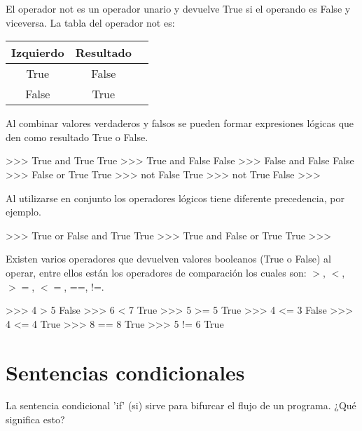 El operador not es un operador unario y devuelve True si el operando es False y viceversa. La tabla del operador not es:\\

\begin{table}[h]
\centering
\begin{tabular}{|c|c|c|} \hline
Izquierdo    & Resultado      \\ \hline
True         & False        \\ \hline
False        & True        \\ \hline
\end{tabular}
\end{table}

Al combinar valores verdaderos y falsos se pueden formar expresiones lógicas que den como resultado True o False.\\

\begin{pyglist} [language=python]
>>> True and True
True
>>> True and False
False
>>> False and False
False
>>> False or True
True
>>> not False
True
>>> not True
False
>>>
\end{pyglist}


Al utilizarse en conjunto los operadores lógicos tiene diferente precedencia, por ejemplo.\\

\begin{pyglist} [language=python]
>>> True or False and True
True
>>> True and False or True
True
>>> 
\end{pyglist}

Existen varios operadores que devuelven valores booleanos (True o False) al operar, entre ellos están los operadores de comparación los cuales son: $>$, $<$, $>=$, $<=$, ==, !=.\\

\begin{pyglist} [language=python]
>>> 4 > 5
False
>>> 6 < 7
True
>>> 5 >= 5
True
>>> 4 <= 3
False
>>> 4 <= 4
True
>>> 8 == 8
True
>>> 5 != 6
True
\end{pyglist}

\section{Sentencias condicionales}

La sentencia condicional 'if' (si) sirve para bifurcar el flujo de un programa. ¿Qué significa esto?\\


